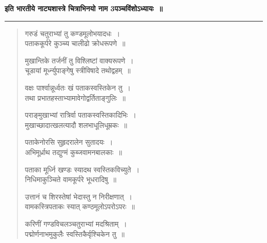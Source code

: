 \documentclass[11pt, openany]{book}
\begin{document}
\begin{center}
\textbf{इति भारतीये नाट्यशास्त्रे चित्राभिनयो नाम 3पञ्चविंशोऽध्यायः~॥}
\end{center}

\hrule

\begin{quote}
{\qt गरुडं चतुराभ्यां तु कण्डमूलोभयादधः~।\\
पताककूर्परे कुञ्च्य चालीढो क्रोधरूपणे~॥

मुखान्तिके तर्जनीं तु विश्लिष्टां वाक्यरूपणे~।\\
चूडायां मूर्ध्न्युपाङ्गेषु स्त्रीविषादे तथोद्वहम्~॥

वक्षः पार्श्वान्नूर्ध्वतः खं पताकस्वस्तिकेन तु~।\\
तथा प्रभातहस्ताभ्यामावेगोद्वर्तिताङ्गुलिः~॥

पराङ्मुखाभ्यां रात्रिर्वा पताकस्वस्तिकादिभिः~।\\
मुखाच्छादात्खलत्यादौ शलभाधूलिधूम्रकः~॥

पताकेनोरसि सुहृदरालेन सुतादयः~।\\
अभिमूर्ध्राथ तद्युग्मं कुब्जवामनबालकाः~॥

पताका मूर्ध्नि खण्डः स्यादथ स्वस्तिकविच्युते~।\\
निधिमाकुञ्चिते वामकूर्परे भूधरादिषु~॥

उत्तानं च शिरस्तेषां भेदास्तु न निरीक्षणात्~।\\
वामकस्त्रिपताकः स्यात् कण्ठमूलोऽपरोऽपरः~॥

करिणीं गण्डविचलञ्चतुराभ्यां मदश्रिताम्~।\\
पद्मोर्णनाभमुकुलैः स्वस्तिकैर्वृश्चिकेन तु~॥}
\end{quote}


\newpage
\lfoot{}
\end{document}
